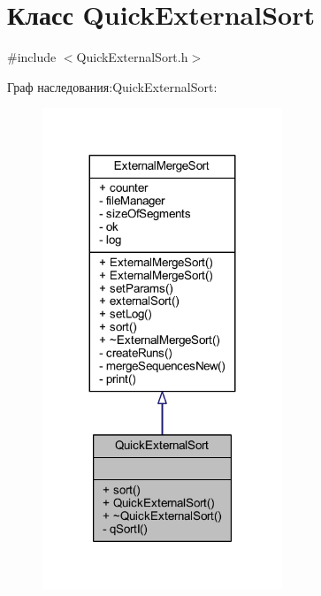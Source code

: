 \hypertarget{class_quick_external_sort}{}\section{Класс Quick\+External\+Sort}
\label{class_quick_external_sort}


{\ttfamily \#include $<$Quick\+External\+Sort.\+h$>$}



Граф наследования\+:Quick\+External\+Sort\+:\nopagebreak
\begin{figure}[H]
\begin{center}
\leavevmode
\includegraphics[width=203pt]{class_quick_external_sort__inherit__graph}
\end{center}
\end{figure}


